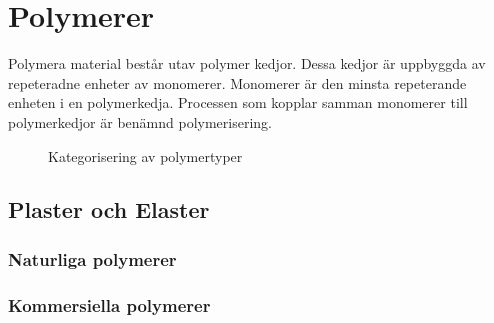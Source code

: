 \section{Polymerer}
Polymera material består utav polymer kedjor. Dessa kedjor är uppbyggda av repeteradne enheter av monomerer. Monomerer är den minsta repeterande enheten i en polymerkedja. Processen som kopplar samman monomerer till polymerkedjor är benämnd polymerisering.

\begin{figure}[ht]
    \centering
    
    \caption{Kategorisering av polymertyper \cite[s.5]{polym}}
    \label{fig:polymer_typer}
\end{figure}



\subsection{Plaster och Elaster}
\subsubsection{Naturliga polymerer}
\subsubsection{Kommersiella polymerer}

